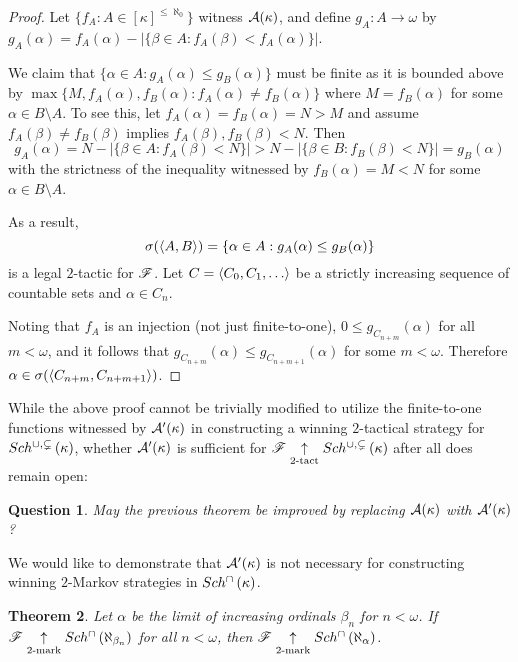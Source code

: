 \documentclass{amsart}
\theoremstyle{plain}
\newtheorem{theorem}{Theorem}
\newtheorem{question}[theorem]{Question}
\theoremstyle{definition}
\theoremstyle{remark}
\theoremstyle{plain}
\theoremstyle{definition}
\theoremstyle{remark}
\begin{document}
  \begin{proof}
    Let \(\{f_A:A\in[\kappa]^{\leq\aleph_0}\}\) witness
    \(\mathcal{A}(\kappa)\), and define \(g_A:A\to\omega\) by
    \(g_A(\alpha)=f_A(\alpha)-|\{\beta\in A:f_A(\beta)<f_A(\alpha)\}|\).

    We claim that \(\{\alpha\in A:g_A(\alpha)\leq g_B(\alpha)\}\)
    must be finite as it is bounded above by
    \(\max\{M,f_A(\alpha),f_B(\alpha):f_A(\alpha)\not=f_B(\alpha)\}\)
    where \(M=f_B(\alpha)\) for some \(\alpha\in B\setminus A\).
    To see this, let \(f_A(\alpha)=f_B(\alpha)=N>M\) and assume
    \(f_A(\beta)\not=f_B(\beta)\) implies \(f_A(\beta),f_B(\beta)<N\).
    Then
    \[
      g_A(\alpha)
        =
      N-|\{\beta\in A:f_A(\beta)<N\}|
        >
      N-|\{\beta\in B:f_B(\beta)<N\}|
        =
      g_B(\alpha)
    \]
    with the strictness of the inequality witnessed by \(f_B(\alpha)=M<N\)
    for some \(\alpha\in B\setminus A\).

    As a result,
    \[
      \sigma(\langle A,B\rangle)
        =
      \{\alpha\in A:g_A(\alpha)\leq g_B(\alpha)\}
    \]
    is a legal \(2\)-tactic for \(\mathscr{F}\). Let \(C=\<C_0,C_1,\dots\>\) be
    a strictly increasing sequence of countable sets and
    \(\alpha\in C_n\).

    Noting that \(f_A\) is an injection
    (not just finite-to-one), \(0\leq g_{C_{n+m}}(\alpha)\) for all
    \(m<\omega\), and it follows that
    \(g_{C_{n+m}}(\alpha)\leq g_{C_{n+m+1}}(\alpha)\) for some \(m<\omega\).
    Therefore \(\alpha\in\sigma(\langle C_{n+m},C_{n+m+1}\rangle)\).
  \end{proof}

  While the above proof cannot be trivially modified to utilize
  the finite-to-one functions witnessed by
  \(\mathcal{A}'(\kappa)\) in constructing a winning \(2\)-tactical strategy
  for \(Sch^{\cup,\subsetneq}\left({\kappa}\right)\), whether
  \(\mathcal{A}'(\kappa)\) is sufficient for
  \(\mathscr{F}\underset{2\text{-tact}}{\uparrow}Sch^{\cup,\subsetneq}\left({\kappa}\right)\) after all
  does remain open:

  \begin{question}
    May the previous theorem be improved by replacing \(\mathcal{A}(\kappa)\)
    with \(\mathcal{A}'(\kappa)\)?
  \end{question}

  We would like to demonstrate that \(\mathcal{A}'(\kappa)\) is not
  necessary for constructing winning \(2\)-Markov strategies in
  \(Sch^{\cap}\left({\kappa}\right)\).

  \begin{theorem}
    Let \(\alpha\) be the limit of increasing ordinals \(\beta_n\) for \(n<\omega\).
    If \(\mathscr{F} \underset{2\text{-mark}}{\uparrow}Sch^{\cap}\left({\aleph_{\beta_n}}\right)\) for all
    \(n<\omega\), then \(\mathscr{F}\underset{2\text{-mark}}{\uparrow}Sch^{\cap}\left({\aleph_\alpha}\right)\).
  \end{theorem}
\end{document}
